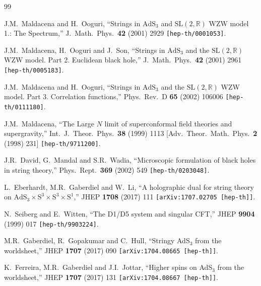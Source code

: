 \documentclass[12pt,a4paper]{article}
\begin{document}
\begin{thebibliography}{99}

J.M.~Maldacena and H.~Ooguri,
``Strings in $\mathrm{AdS}_3$ and $\mathrm{SL}(2,\mathds{R})$ WZW model 1.: The Spectrum,''
J.\ Math.\ Phys.\  {\bf 42} (2001) 2929
{\tt  [hep-th/0001053]}.

J.M.~Maldacena, H.~Ooguri and J.~Son,
``Strings in $\mathrm{AdS}_3$ and the $\mathrm{SL}(2,\mathds{R})$ WZW model. Part 2. Euclidean black hole,''
J.\ Math.\ Phys.\  {\bf 42} (2001) 2961
{\tt [hep-th/0005183]}.
  
J.M.~Maldacena and H.~Ooguri,
``Strings in $\mathrm{AdS}_3$ and the $\mathrm{SL}(2,\mathds{R})$ WZW model. Part 3. Correlation functions,''
Phys.\ Rev.\ D {\bf 65} (2002) 106006
{\tt [hep-th/0111180]}.

  J.M.~Maldacena,
  ``The Large $N$ limit of superconformal field theories and supergravity,''
  Int.\ J.\ Theor.\ Phys.\  {\bf 38} (1999) 1113
  [Adv.\ Theor.\ Math.\ Phys.\  {\bf 2} (1998) 231]
  {\tt [hep-th/9711200]}.
  
J.R.~David, G.~Mandal and S.R.~Wadia,
``Microscopic formulation of black holes in string theory,''
Phys.\ Rept.\  {\bf 369} (2002) 549
{\tt [hep-th/0203048]}.

L.~Eberhardt, M.R.~Gaberdiel and W.~Li,
``A holographic dual for string theory on $\mathrm{AdS}_{3}\times \mathrm{S}^{3}\times \mathrm{S}^{3}\times \mathrm{S}^{1}$,''
JHEP {\bf 1708} (2017) 111
{\tt [arXiv:1707.02705 [hep-th]]}.

N.~Seiberg and E.~Witten,
``The D1/D5 system and singular CFT,''
JHEP {\bf 9904} (1999) 017
{\tt [hep-th/9903224]}.

M.R.~Gaberdiel, R.~Gopakumar and C.~Hull,
``Stringy AdS$_{3}$ from the worldsheet,''
JHEP {\bf 1707} (2017) 090
{\tt [arXiv:1704.08665 [hep-th]]}.

K.~Ferreira, M.R.~Gaberdiel and J.I.~Jottar,
``Higher spins on AdS$_{3}$ from the worldsheet,''
JHEP {\bf 1707} (2017) 131
{\tt [arXiv:1704.08667 [hep-th]]}.


\end{thebibliography}
\end{document}
